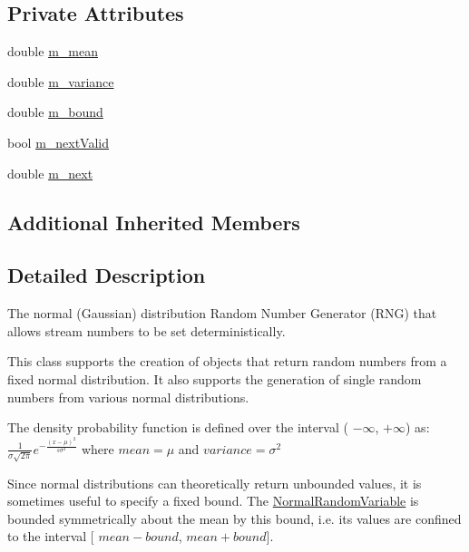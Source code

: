 \subsection*{Private Attributes}
\begin{DoxyCompactItemize}
\item 
double \hyperlink{classns3_1_1NormalRandomVariable_a6a4930dc7c730451277d9889f5b1a0d9}{m\+\_\+mean}
\item 
double \hyperlink{classns3_1_1NormalRandomVariable_aa61551cf5da3b7e76d6df6295129e399}{m\+\_\+variance}
\item 
double \hyperlink{classns3_1_1NormalRandomVariable_ad173b135405ef0f2b7a2a94f7befe9fd}{m\+\_\+bound}
\item 
bool \hyperlink{classns3_1_1NormalRandomVariable_ae8b5000e4f79215ff7e52ef3d4ac1f18}{m\+\_\+next\+Valid}
\item 
double \hyperlink{classns3_1_1NormalRandomVariable_af0098cd1acde38a476badc5a1e307a7c}{m\+\_\+next}
\end{DoxyCompactItemize}
\subsection*{Additional Inherited Members}


\subsection{Detailed Description}
The normal (Gaussian) distribution Random Number Generator (R\+NG) that allows stream numbers to be set deterministically. 

This class supports the creation of objects that return random numbers from a fixed normal distribution. It also supports the generation of single random numbers from various normal distributions.

The density probability function is defined over the interval ( $-\infty$, $+\infty$) as\+: $ \frac{1}{\sigma\sqrt{2\pi}} e^{-\frac{(x-\mu)^2}{s\sigma^2}}$ where $ mean = \mu $ and $ variance = \sigma^2 $

Since normal distributions can theoretically return unbounded values, it is sometimes useful to specify a fixed bound. The \hyperlink{classns3_1_1NormalRandomVariable}{Normal\+Random\+Variable} is bounded symmetrically about the mean by this bound, i.\+e. its values are confined to the interval \mbox{[} $mean-bound$, $mean+bound$\mbox{]}.


